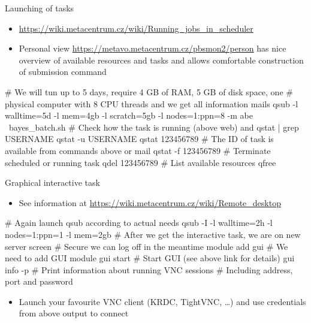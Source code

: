 \documentclass[compress, ucs, xelatex, 11pt, xcolor=svgnames,
  hyperref={
    bookmarks=true,
    unicode=true,
    colorlinks=true,
    pdftitle={Linux, command line and MetaCentrum},
    plainpages=false,
    pdfauthor={Vojtech Zeisek},
    pdfsubject={Course about use of Linux command line, writing shell scripts and using MetaCentrum of CESNET},
    pdfcreator={XeLaTeX, http://www.xelatex.org/},
    pdfkeywords={Linux, GNU, BASH, shell, command line, MetaCentrum},
    linkcolor=Sienna,
    anchorcolor=black,
    citecolor=green,
    filecolor=magenta,
    menucolor=Sienna,
    urlcolor=cyan,
    pdftex},
  url={hyphens, lowtilde} %
  ]{beamer}
\begin{document}
\begin{frame}[fragile]{Launching of tasks}
\begin{itemize}
  \item \url{https://wiki.metacentrum.cz/wiki/Running_jobs_in_scheduler}
  \item Personal view \url{https://metavo.metacentrum.cz/pbsmon2/person} has nice overview of available resources and tasks and allows comfortable construction of submission command
\end{itemize}
  \begin{bashcode}
    # We will tun up to 5 days, require 4 GB of RAM, 5 GB of disk space, one
    # physical computer with 8 CPU threads and we get all information mails
    qsub -l walltime=5d -l mem=4gb -l scratch=5gb -l nodes=1:ppn=8 -m abe \
      bayes_batch.sh
    # Check how the task is running (above web) and
    qstat | grep USERNAME
    qstat -u USERNAME
    qstat 123456789 # The ID of task is available from commands above or mail
    qstat -f 123456789
    # Terminate scheduled or running task
    qdel 123456789
    # List available resources
    qfree
  \end{bashcode}
\end{frame}

\begin{frame}[fragile]{Graphical interactive task}
\begin{itemize}
  \item See information at \url{https://wiki.metacentrum.cz/wiki/Remote_desktop}
\end{itemize}
  \begin{bashcode}
    # Again launch qsub according to actual needs
    qsub -I -l walltime=2h -l nodes=1:ppn=1 -l mem=2gb
    # After we get the interactive task, we are on new server
    screen # Secure we can log off in the meantime
    module add gui # We need to add GUI module
    gui start # Start GUI (see above link for details)
    gui info -p # Print information about running VNC sessions
                # Including address, port and password
  \end{bashcode}
\begin{itemize}
  \item Launch your favourite VNC client (KRDC, TightVNC, \ldots) and use credentials from above output to connect
\end{itemize}
\end{frame}
\end{document}

